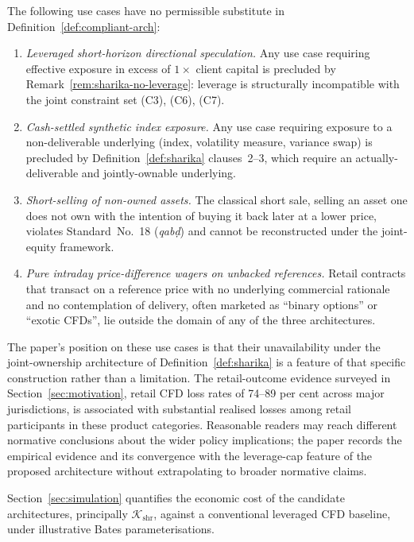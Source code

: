\documentclass[preprint,12pt,authoryear]{elsarticle}
\theoremstyle{definition}
\begin{document}
The following use cases have no permissible substitute in
Definition~\ref{def:compliant-arch}:
\begin{enumerate}
    \item \emph{Leveraged short-horizon directional speculation.}
    Any use case requiring effective exposure in excess of $1\times$
    client capital is precluded by
    Remark~\ref{rem:sharika-no-leverage}: leverage is structurally
    incompatible with the joint constraint set (C3), (C6), (C7).
    \item \emph{Cash-settled synthetic index exposure.} Any use
    case requiring exposure to a non-deliverable underlying (index,
    volatility measure, variance swap) is precluded by
    Definition~\ref{def:sharika} clauses~2--3, which require an
    actually-deliverable and jointly-ownable underlying.
    \item \emph{Short-selling of non-owned assets.} The classical
    short sale, selling an asset one does not own with the
    intention of buying it back later at a lower price,
    violates Standard~No.~18 (\emph{qab\d{d}}) and cannot be
    reconstructed under the joint-equity framework.
    \item \emph{Pure intraday price-difference wagers on
    unbacked references.} Retail contracts that transact on a
    reference price with no underlying commercial rationale and no
    contemplation of delivery, often marketed as ``binary
    options'' or ``exotic CFDs'', lie outside the domain of any
    of the three architectures.
\end{enumerate}

The paper's position on these use cases is that their
unavailability under the joint-ownership architecture of
Definition~\ref{def:sharika} is a feature of that specific
construction rather than a limitation. The retail-outcome
evidence surveyed in Section~\ref{sec:motivation}, retail
CFD loss rates of 74--89 per cent across major jurisdictions,
is associated with substantial realised losses among retail
participants in these product categories. Reasonable readers
may reach different normative conclusions about the wider
policy implications; the paper records the empirical evidence
and its convergence with the leverage-cap feature of the
proposed architecture without extrapolating to broader
normative claims.

Section~\ref{sec:simulation} quantifies the economic cost of the
candidate architectures, principally
$\mathcal{K}_{\text{shr}}$, against a conventional leveraged
CFD baseline, under illustrative Bates parameterisations.
\end{document}
